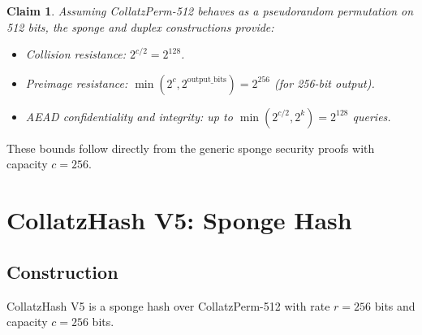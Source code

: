 \documentclass[11pt,a4paper]{article}
\newtheorem{claim}{Claim}
\begin{document}
\begin{claim}
Assuming CollatzPerm-512 behaves as a pseudorandom permutation on 512
bits, the sponge and duplex constructions provide:
\begin{itemize}
    \item Collision resistance: $2^{c/2} = 2^{128}$.
    \item Preimage resistance:
          $\min(2^c, 2^{\mathrm{output\_bits}}) = 2^{256}$ (for 256-bit
          output).
    \item AEAD confidentiality and integrity: up to
          $\min(2^{c/2}, 2^k) = 2^{128}$ queries.
\end{itemize}
\end{claim}

These bounds follow directly from the generic sponge security
proofs \cite{sponge_security} with capacity $c = 256$.

\section{CollatzHash V5: Sponge Hash}
\label{sec:hash}

\subsection{Construction}

CollatzHash V5 is a sponge hash \cite{keccak_sponge} over CollatzPerm-512
with rate $r = 256$ bits and capacity $c = 256$ bits.
\end{document}
